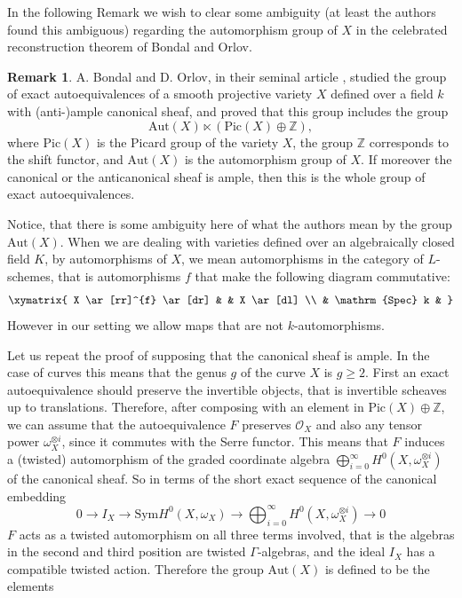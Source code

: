 \documentclass[10pt]{amsart}
\theoremstyle{definition}
\newtheorem{remark}[theorem]{Remark}
\begin{document}
In the following Remark we wish to clear some ambiguity (at least the authors found this ambiguous) regarding the automorphism group of $X$ in the celebrated reconstruction theorem of Bondal and Orlov.



\begin{remark}\label{rem:bondal orlov remark}
  A. Bondal  and D. Orlov, in their seminal article \cite{MR1818984}, studied the group of exact autoequivalences of a smooth projective variety $X$ defined over a field $k$ with (anti-)ample canonical sheaf, and proved that this group includes the group 
  \[
    \mathrm{Aut}(X) \ltimes (\mathrm{Pic}(X) \oplus \mathbb{Z} ),  
  \]
where $\mathrm{Pic}(X)$ is the Picard group of the variety $X$, the group $\mathbb{Z}$ corresponds to the shift functor, and $\mathrm{Aut}(X)$ is the automorphism group of $X$. 
If moreover the canonical or the anticanonical sheaf is ample, then this is the whole group of exact autoequivalences.  

Notice, that there is some ambiguity here of what the authors mean by the group $\mathrm{Aut}(X)$. When we are dealing with varieties defined over an algebraically closed field $K$, by automorphisms of $X$, we mean automorphisms in the category of $L$-schemes, that is automorphisms $f$ that make the following diagram commutative:
\[
  \xymatrix{
 X \ar[rr]^{f} \ar[dr] &  & X \ar[dl]
 \\
 & \mathrm{Spec} k & 
  }
\]
However in our setting we allow maps that are not $k$-automorphisms. 

Let us repeat the proof of \cite[Th. 3.1]{MR1818984} supposing that the canonical sheaf is ample. In the case of curves this means that the genus $g$ of the curve $X$ is $g \geq 2$. First an exact autoequivalence should preserve the invertible objects, that is invertible scheaves up to translations. Therefore, after composing with an element in $\mathrm{Pic}(X) \oplus \mathbb{Z}$, we can assume that the autoequivalence $F$ preserves $\mathcal{O}_X$ and also any tensor power $\omega_X^{\otimes i}$, since it commutes with the Serre functor. This means that $F$ induces a (twisted) automorphism of the graded coordinate algebra $\bigoplus_{i=0}^\infty H^0(X, \omega_X^{\otimes i})$ of the canonical sheaf. So in terms of the short exact sequence of the canonical embedding 
\[
0 \rightarrow  I_X \longrightarrow  \mathrm{Sym} H^0(X, \omega_X ) \longrightarrow 
\bigoplus_{i=0}^\infty H^0(X, \omega_X^{\otimes i}) 
\rightarrow 0  
\]  
$F$ acts as a twisted automorphism on all three terms involved, 
that is the algebras in the second and third position are twisted $\Gamma$-algebras, and the ideal $I_X$ has a compatible twisted action. 
Therefore the group $\mathrm{Aut}(X)$ is defined to be the elements


\end{remark}
\end{document}
